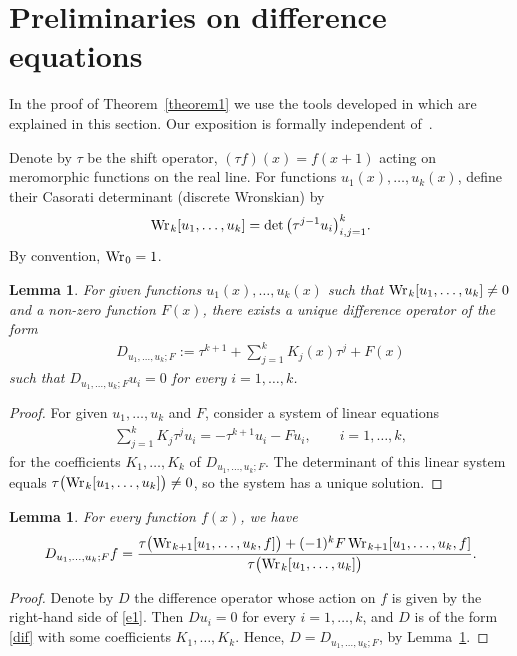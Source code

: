 \documentclass[pdftex]{sigma}
\numberwithin{equation}{section}
\newtheorem{lem}[thm]{Lemma}
 { \theoremstyle{definition}
\newtheorem{Remark}[thm]{Remark} }
\def\lc{,\allowbreak\ldots,\allowbreak}
\def\Wr{\mathop{\mathrm{Wr\vrule height0pt width.6pt}}\nolimits}
\begin{document}
\section{Preliminaries on difference equations}\label{section4}

In the proof of Theorem~\ref{theorem1} we use the tools developed in \cite{MTV} which are explained in this section. Our exposition is formally independent of~\cite{MTV}.

Denote by $\tau$ be the shift operator, $(\tau f)(x)=f(x+1)$ acting on meromorphic functions on the real line. For functions $u_1(x)\lc u_k(x)$, define their Casorati determinant (discrete Wronskian) by
\begin{gather*}
\Wr_k[u_1\lc u_k] = \det\big(\tau^{j-1}u_i\big)_{i,j=1}^k.
\end{gather*}
By convention, $\Wr_0=1$.
\begin{lem}\label{L1}
For given functions $u_1(x)\lc u_k(x)$ such that $\Wr_k[u_1\lc u_k]\ne 0$ and a non-zero function $F(x)$, there exists a unique difference operator of the form
\begin{gather}\label{dif}
D_{u_1\lc u_k;F}:=\tau^{k+1}+\sum_{j=1}^k K_j(x)\tau^j+F(x)
\end{gather}
such that $D_{u_1\lc u_k;F}u_i=0$ for every $i=1\lc k$.
\end{lem}

\begin{proof} For given $u_1\lc u_k$ and $F$, consider a system of linear equations
\begin{gather*}
\sum_{j=1}^kK_j \tau^ju_i=-\tau^{k+1}u_i-Fu_i,\qquad i=1\lc k,
\end{gather*}
for the coefficients $K_1\lc K_k$ of $D_{u_1\lc u_k;F}$. The determinant of this linear system equals $\tau\bigl(\Wr_k[u_1\lc u_k]\bigr)\ne 0$, so the system has a unique solution.
\end{proof}

\begin{lem}\label{L2}
For every function $f(x)$, we have
\begin{gather}
D_{u_1\lc u_k; F} f = \frac{\tau\bigl(\Wr_{k+1}[u_1\lc u_k,f]\bigr)+ (-1)^kF\Wr_{k+1}[u_1\lc u_k,f]}{\tau\bigl(\Wr_k[u_1\lc u_k]\bigr)}.\label{e1}
\end{gather}
\end{lem}

\begin{proof} Denote by $D$ the difference operator whose action on $f$ is given by the right-hand side of \eqref{e1}. Then $Du_i=0$ for every $i=1\lc k$, and $D$ is of the form \eqref{dif} with some coefficients $K_1\lc K_k$. Hence, $D=D_{u_1\lc u_k; F}$, by Lemma~\ref{L1}.
\end{proof}
\end{document}
